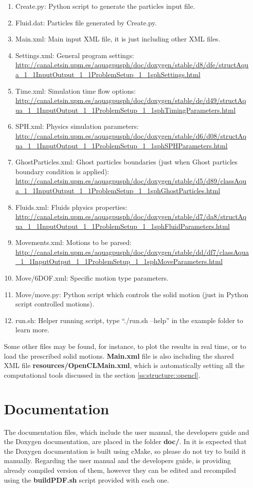 \begin{enumerate}
	\item Create.py: Python script to generate the particles input file.
	\item Fluid.dat: Particles file generated by Create.py.
	\item Main.xml: Main input XML file, it is just including other XML files.
	\item Settings.xml: General program settings:
	\url{http://canal.etsin.upm.es/aquagpusph/doc/doxygen/stable/d8/dfe/structAqua_1_1InputOutput_1_1ProblemSetup_1_1sphSettings.html}
	\item Time.xml: Simulation time flow options:
	\url{http://canal.etsin.upm.es/aquagpusph/doc/doxygen/stable/de/d49/structAqua_1_1InputOutput_1_1ProblemSetup_1_1sphTimingParameters.html}
	\item SPH.xml: Physics simulation parameters:
	\url{http://canal.etsin.upm.es/aquagpusph/doc/doxygen/stable/d6/d08/structAqua_1_1InputOutput_1_1ProblemSetup_1_1sphSPHParameters.html}
	\item GhostParticles.xml: Ghost particles boundaries (just when Ghost particles boundary condition is applied):
	\url{http://canal.etsin.upm.es/aquagpusph/doc/doxygen/stable/d5/d89/classAqua_1_1InputOutput_1_1ProblemSetup_1_1sphGhostParticles.html}
	\item Fluids.xml: Fluids physics properties:
	\url{http://canal.etsin.upm.es/aquagpusph/doc/doxygen/stable/d7/da8/structAqua_1_1InputOutput_1_1ProblemSetup_1_1sphFluidParameters.html}
	\item Movements.xml: Motions to be parsed:
	\url{http://canal.etsin.upm.es/aquagpusph/doc/doxygen/stable/dd/df7/classAqua_1_1InputOutput_1_1ProblemSetup_1_1sphMoveParameters.html}
	\item Move/6DOF.xml: Specific motion type parameters.
	\item Move/move.py: Python script which controls the solid motion (just in Python script controlled motions).
	\item run.sh: Helper running script, type ``./run.sh --help'' in the example folder to learn more.
\end{enumerate}
%
Some other files may be found, for instance, to plot the results in real time, or to load the prescribed solid motions.\rc
%
\textbf{Main.xml} file is also including the shared XML file \textbf{resources/OpenCLMain.xml}, which is automatically setting all the computational tools discussed in the section \ref{ss:structure::opencl}.
%
\section{Documentation}
\label{ss:structure::doc}
%
The documentation files, which include the user manual, the developers guide and the Doxygen documentation, are placed in the folder \textbf{doc/}.\rc
%
In \NAME it is expected that the Doxygen documentation is built using cMake, so please do not try to build it manually.\rc
%
Regarding the user manual and the developers guide, \NAME is providing already compiled version of them, however they can be edited and recompiled using the \textbf{buildPDF.sh} script provided with each one.